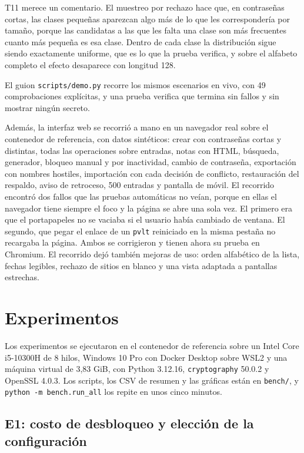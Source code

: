 \documentclass[11pt,letterpaper]{article}
\newcommand{\code}[1]{\texttt{#1}}
\newcommand{\pvlt}{\code{pvlt}}
\begin{document}
T11 merece un comentario. El muestreo por rechazo hace que, en contraseñas cortas, las clases pequeñas aparezcan algo más de lo que les correspondería por tamaño, porque las candidatas a las que les falta una clase son más frecuentes cuanto más pequeña es esa clase. Dentro de cada clase la distribución sigue siendo exactamente uniforme, que es lo que la prueba verifica, y sobre el alfabeto completo el efecto desaparece con longitud 128.

El guion \code{scripts/demo.py} recorre los mismos escenarios en vivo, con 49 comprobaciones explícitas, y una prueba verifica que termina sin fallos y sin mostrar ningún secreto.

Además, la interfaz web se recorrió a mano en un navegador real sobre el contenedor de referencia, con datos sintéticos: crear con contraseñas cortas y distintas, todas las operaciones sobre entradas, notas con HTML, búsqueda, generador, bloqueo manual y por inactividad, cambio de contraseña, exportación con nombres hostiles, importación con cada decisión de conflicto, restauración del respaldo, aviso de retroceso, 500 entradas y pantalla de móvil. El recorrido encontró dos fallos que las pruebas automáticas no veían, porque en ellas el navegador tiene siempre el foco y la página se abre una sola vez. El primero era que el portapapeles no se vaciaba si el usuario había cambiado de ventana. El segundo, que pegar el enlace de un \pvlt{} reiniciado en la misma pestaña no recargaba la página. Ambos se corrigieron y tienen ahora su prueba en Chromium. El recorrido dejó también mejoras de uso: orden alfabético de la lista, fechas legibles, rechazo de sitios en blanco y una vista adaptada a pantallas estrechas.

\section{Experimentos}\label{sec:experimentos}

Los experimentos se ejecutaron en el contenedor de referencia sobre un Intel Core i5-10300H de 8 hilos, Windows 10 Pro con Docker Desktop sobre WSL2 y una máquina virtual de 3,83 GiB, con Python 3.12.16, \code{cryptography} 50.0.2 y OpenSSL 4.0.3. Los scripts, los CSV de resumen y las gráficas están en \code{bench/}, y \code{python -m bench.run\_all} los repite en unos cinco minutos.

\subsection{E1: costo de desbloqueo y elección de la configuración}
\end{document}
